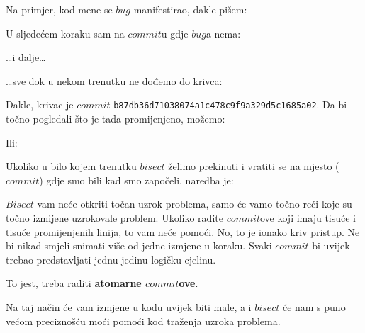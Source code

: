 Na primjer, kod mene se $bug$ manifestirao, dakle pišem:



U sljedećem koraku sam na $commit$u gdje $bug$a nema:



\dots{}i dalje\dots



\dots{}sve dok u nekom trenutku ne dođemo do krivca:



Dakle, krivac je $commit$ \verb+b87db36d71038074a1c478c9f9a329d5c1685a02+.
Da bi točno pogledali što je tada promijenjeno, možemo:


Ili:


Ukoliko u bilo kojem trenutku $bisect$ želimo prekinuti i vratiti se na mjesto ($commit$) gdje smo bili kad smo započeli, naredba je:



$Bisect$ vam neće otkriti točan uzrok problema, samo će vamo točno reći koje su točno izmijene uzrokovale problem.
Ukoliko radite $commit$ove koji imaju tisuće i tisuće promijenjenih linija, to vam neće pomoći.
No, to je ionako kriv pristup.
Ne bi nikad smjeli snimati više od jedne izmjene u koraku.
Svaki $commit$ bi uvijek trebao predstavljati jednu jedinu logičku cjelinu.

To jest, treba raditi \textbf{atomarne $commit$ove}.

Na taj način će vam izmjene u kodu uvijek biti male, a i $bisect$ će nam s puno većom preciznošću moći pomoći kod traženja uzroka problema.
